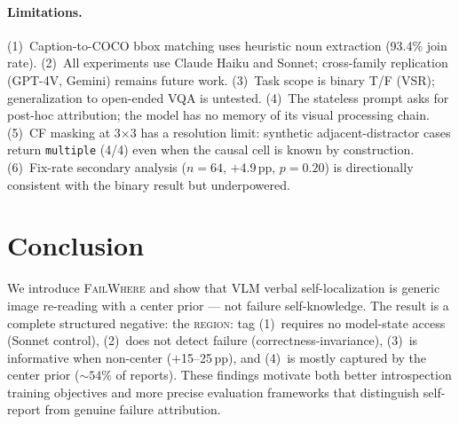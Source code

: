 \documentclass[twoside,11pt]{article}
\begin{document}
\paragraph{Limitations.}
(1)~Caption-to-COCO bbox matching uses heuristic noun extraction (93.4\% join rate).
(2)~All experiments use Claude Haiku and Sonnet; cross-family replication
(GPT-4V, Gemini) remains future work.
(3)~Task scope is binary T/F (VSR); generalization to open-ended VQA is untested.
(4)~The stateless prompt asks for post-hoc attribution; the model has no memory
of its visual processing chain.
(5)~CF masking at 3$\times$3 has a resolution limit: synthetic adjacent-distractor
cases return \texttt{multiple} (4/4) even when the causal cell is known by
construction.
(6)~Fix-rate secondary analysis ($n{=}64$, $+$4.9\,pp, $p{=}0.20$) is
directionally consistent with the binary result but underpowered.


\section{Conclusion}

We introduce \textsc{FailWhere} and show that VLM verbal self-localization is
generic image re-reading with a center prior — not failure self-knowledge.
The result is a complete structured negative: the \textsc{region:} tag
(1)~requires no model-state access (Sonnet control), (2)~does not detect
failure (correctness-invariance), (3)~is informative when non-center
($+$15--25\,pp), and (4)~is mostly captured by the center prior (${\sim}54\%$
of reports).
These findings motivate both better introspection training objectives and
more precise evaluation frameworks that distinguish self-report from genuine
failure attribution.


\end{document}
